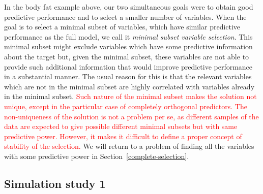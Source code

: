 \documentclass[a4]{article}
\let\rmarkdownfootnote\footnote%
\def\footnote{\protect\rmarkdownfootnote}
\theoremstyle{definition}
\newcommand{\fede}[1]{\textcolor{red}{#1}}
\begin{document}
In the body fat example above, our two simultaneous goals were to 
obtain good predictive performance and to select a smaller number of variables. 
When the goal is to select a minimal subset of variables,
which have similar predictive performance as the full model, we call it
\emph{minimal subset variable selection}. This minimal subset might
exclude variables which have some predictive information about the
target but, given the minimal subset, these variables are not able to
provide such additional information that would improve predictive
performance in a substantial manner.
The usual reason for this is that the relevant variables
which are not in the minimal subset are highly correlated with variables already in
the minimal subset. \fede{Such nature of the minimal subset makes the solution
not unique, except in the particular case of completely orthogonal predictors. 
The non-uniqueness of the solution is not a problem per se, as different samples of the data
are expected to give possible different minimal subsets but with same predictive power. 
However, it makes it difficult to define a proper
concept of stability of the selection.} 
We will return to a problem of finding all
the variables with some predictive power in Section~\ref{complete-selection}.
%

\subsection{Simulation study 1}\label{minimal-simulated}
\end{document}
